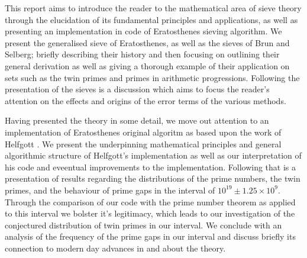 This report aims to introduce the reader to the mathematical area of sieve theory through the elucidation of its fundamental principles and applications, as well as presenting an implementation in code of Eratosthenes sieving algorithm. 
We present the generalised sieve of Eratosthenes, as well as the sieves of Brun and Selberg; briefly describing their history and then focusing on outlining their general derivation as well as giving a thorough example of their application on sets such as the twin primes and primes in arithmetic progressions. 
Following the presentation of the sieves is a discussion which aims to focus the reader's attention on the effects and origins of the error terms of the various methods.

Having presented the theory in some detail, we move out attention to an implementation of Eratosthenes original algoritm as based upon the work of Helfgott \cite{HaraldSieve}.
We present the underpinning mathematical principles and general algorithmic structure of Helfgott's implementation as well as our interpretation of his code and eveentual improvements to the implementation.
Following that is a presentation of results regarding the distributions of the prime numbers, the twin primes, and the behaviour of prime gaps in the interval of \(10^{19}\pm 1.25\times10^9\).
Through the comparison of our code with the prime number theorem as applied to this interval we bolster it's legitimacy, which leads to our investigation of the conjectured distribution of twin primes in our interval.
We conclude with an analysis of the frequency of the prime gaps in our interval and discuss briefly its connection to modern day advances in and about the theory.